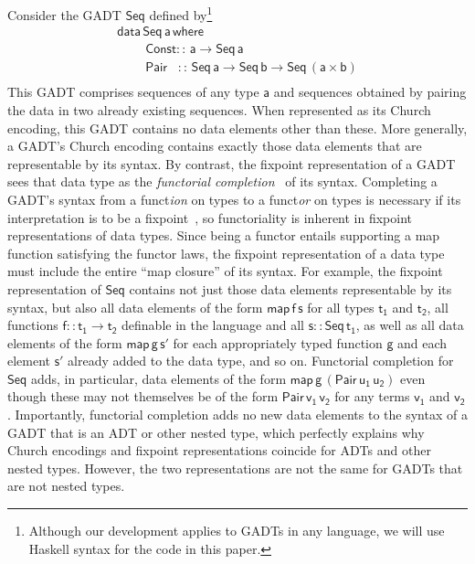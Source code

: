 \documentclass[submission,copyright,creativecommons]{eptcs}
\begin{document}
Consider the GADT $\mathsf{Seq}$ defined by\footnote{Although our
  development applies to GADTs in any language, we will use Haskell
  syntax for the code in this paper.}
\begin{equation}\label{eq:seq}
\begin{array}{l}
\mathsf{data\, Seq\,a\,where}\\
\mathsf{\;\;\;\;\;\;\;\;Const ::\, a \to Seq\,a}\\
\mathsf{\;\;\;\;\;\;\;\;Pair\,\,\,\,\, ::\, Seq \,a \to Seq\,b \to
  Seq\,(a \times b)}\\ 
\end{array}
\end{equation}
\noindent
This GADT comprises sequences of any type $\mathsf{a}$ and sequences
obtained by pairing the data in two already existing sequences. When
represented as its Church encoding, this GADT contains no data
elements other than these. More generally, a GADT's Church encoding
contains exactly those data elements that are representable by its
syntax. By contrast, the fixpoint representation of a GADT sees that
data type as the {\em functorial completion}~\cite{jp19} of its
syntax.  Completing a GADT's syntax from a funct{\em ion} on types to
a funct{\em or} on types is necessary if its interpretation is to be a
fixpoint~\cite{tfca}, so functoriality is inherent in fixpoint
representations of data types. Since being a functor entails
supporting a map function satisfying the functor laws, the fixpoint
representation of a data type must include the entire ``map closure''
of its syntax.  For example, the fixpoint representation of
$\mathsf{Seq}$ contains not just those data elements representable by
its syntax, but also all data elements of the form
$\mathsf{map\,f\,s}$ for all types $\mathsf{t_1}$ and $\mathsf{t_2}$,
all functions $\mathsf{f :: t_1 \to t_2}$ definable in the language and
all $\mathsf{s :: Seq\,t_1}$, as well as all data elements of the form
$\mathsf{map\,g\,s'}$ for each appropriately typed function
$\mathsf{g}$ and each element $\mathsf{s'}$ already added to the data
type, and so on. Functorial completion for $\mathsf{Seq}$ adds, in
particular, data elements of the form
$\mathsf{map\,g\,(Pair\,u_1\,u_2)}$ even though these may not
themselves be of the form $\mathsf{Pair\,v_1\,v_2}$ for any terms
$\mathsf{v_1}$ and $\mathsf{v_2}$. Importantly, functorial completion
adds no new data elements to the syntax of a GADT that is an ADT or
other nested type, which perfectly explains why Church encodings and
fixpoint representations coincide for ADTs and other nested
types. However, the two representations are not the same for GADTs
that are not nested types.
\end{document}

